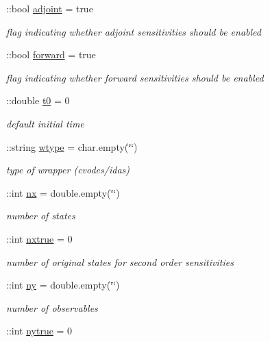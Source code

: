 \begin{DoxyCompactItemize}
\+::bool \hyperlink{classamimodel_ab6d500b41cf50693452415caca31d32e}{adjoint} = true
\begin{DoxyCompactList}\small\item\em flag indicating whether adjoint sensitivities should be enabled \end{DoxyCompactList}\item 
\+::bool \hyperlink{classamimodel_a81e42e48c9c72814166c8f7cd414ce24}{forward} = true
\begin{DoxyCompactList}\small\item\em flag indicating whether forward sensitivities should be enabled \end{DoxyCompactList}\item 
\+::double \hyperlink{classamimodel_abdb5a42ffee3ca622484b53a322f1004}{t0} = 0
\begin{DoxyCompactList}\small\item\em default initial time \end{DoxyCompactList}\item 
\+::string \hyperlink{classamimodel_a5376250224ce32fb558d88aa0b5a93ff}{wtype} = char.\+empty(\char`\"{}\char`\"{})
\begin{DoxyCompactList}\small\item\em type of wrapper (cvodes/idas) \end{DoxyCompactList}\item 
\+::int \hyperlink{classamimodel_a84e4236f07668a770c27567f1f9615ff}{nx} = double.\+empty(\char`\"{}\char`\"{})
\begin{DoxyCompactList}\small\item\em number of states \end{DoxyCompactList}\item 
\+::int \hyperlink{classamimodel_a49c476de14a021114feb8c95da04952a}{nxtrue} = 0
\begin{DoxyCompactList}\small\item\em number of original states for second order sensitivities \end{DoxyCompactList}\item 
\+::int \hyperlink{classamimodel_a289ca425eb368f1d582b6be2be0d3dfc}{ny} = double.\+empty(\char`\"{}\char`\"{})
\begin{DoxyCompactList}\small\item\em number of observables \end{DoxyCompactList}\item 
\+::int \hyperlink{classamimodel_ac91d7b36031ec122abc9f739692b02e8}{nytrue} = 0

\end{DoxyCompactItemize}
